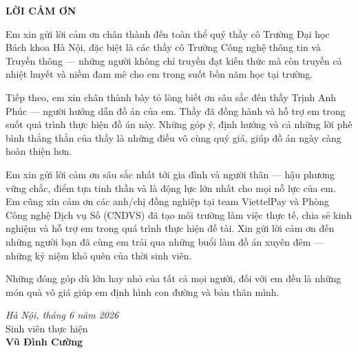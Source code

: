 \documentclass[../DoAn.tex]{subfiles}
\begin{document}
\begin{center}
    \Large{\textbf{LỜI CẢM ƠN}}\\
\end{center}
\vspace{1cm}


Em xin gửi lời cảm ơn chân thành đến toàn thể quý thầy cô Trường Đại học Bách khoa Hà Nội, đặc biệt là các thầy cô Trường Công nghệ thông tin và Truyền thông --- những người không chỉ truyền đạt kiến thức mà còn truyền cả nhiệt huyết và niềm đam mê cho em trong suốt bốn năm học tại trường.

Tiếp theo, em xin chân thành bày tỏ lòng biết ơn sâu sắc đến thầy Trịnh Anh Phúc --- người hướng dẫn đồ án của em. Thầy đã đồng hành và hỗ trợ em trong suốt quá trình thực hiện đồ án này. Những góp ý, định hướng và cả những lời phê bình thẳng thắn của thầy là những điều vô cùng quý giá, giúp đồ án ngày càng hoàn thiện hơn.

Em xin gửi lời cảm ơn sâu sắc nhất tới gia đình và người thân --- hậu phương vững chắc, điểm tựa tinh thần và là động lực lớn nhất cho mọi nỗ lực của em. Em cũng xin cảm ơn các anh/chị đồng nghiệp tại team ViettelPay và Phòng Công nghệ Dịch vụ Số (CNDVS) đã tạo môi trường làm việc thực tế, chia sẻ kinh nghiệm và hỗ trợ em trong quá trình thực hiện đề tài. Xin gửi lời cảm ơn đến những người bạn đã cùng em trải qua những buổi làm đồ án xuyên đêm --- những kỷ niệm khó quên của thời sinh viên.

Những đóng góp dù lớn hay nhỏ của tất cả mọi người, đối với em đều là những món quà vô giá giúp em định hình con đường và bản thân mình.

\begin{flushright}
\textit{Hà Nội, tháng 6 năm 2026}\\[6pt]
Sinh viên thực hiện\\[4pt]
\textbf{Vũ Đình Cường}
\end{flushright}
\end{document}
